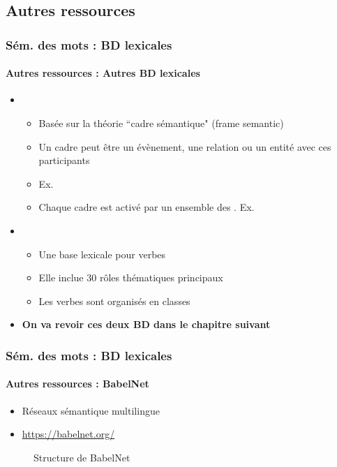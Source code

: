 \documentclass[xcolor=table]{beamer}
\begin{document}
\subsection{Autres ressources}

\begin{frame}
\frametitle{Sém. des mots : BD lexicales}
\framesubtitle{Autres ressources : Autres BD lexicales}
	
\begin{itemize}
	\item {} 
	\begin{itemize}
		\item Basée sur la théorie ``cadre sémantique" (frame semantic)
		\item Un cadre peut être un évènement, une relation ou un entité avec ces participants 
		\item Ex. 
		\item Chaque cadre est activé par un ensemble des . Ex. 
	\end{itemize}
	\item {} 
	\begin{itemize}
		\item Une base lexicale pour verbes
		\item Elle inclue 30 rôles thématiques principaux 
		\item Les verbes sont organisés en classes
	\end{itemize}
	\item \textbf{On va revoir ces deux BD dans le chapitre suivant}
\end{itemize}
	
\end{frame}

\begin{frame}
\frametitle{Sém. des mots : BD lexicales}
\framesubtitle{Autres ressources : BabelNet}

\begin{itemize}
	\item Réseaux sémantique multilingue
	\item \url{https://babelnet.org/}
\end{itemize}

\begin{figure}
	\caption{Structure de BabelNet \cite{2012-navigli-ponzetto}}
\end{figure}
	
\end{frame}
\end{document}
